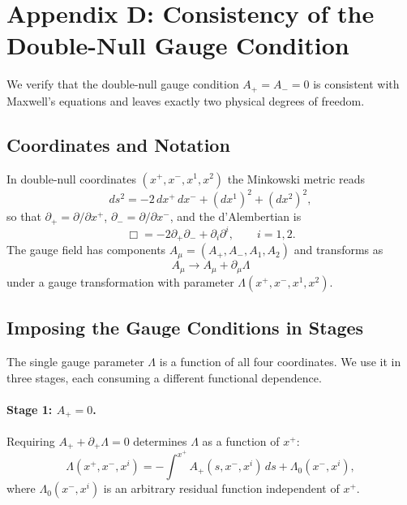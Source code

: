 \section{Appendix D: Consistency of the Double-Null Gauge Condition}
\label{gauge_consistency}

We verify that the double-null gauge condition $A_+ = A_- = 0$ is consistent with 
Maxwell's equations and leaves exactly two physical degrees of freedom.

\subsection{Coordinates and Notation}

In double-null coordinates $(x^+, x^-, x^1, x^2)$ the Minkowski metric reads
\begin{equation}
    ds^2 = -2\,dx^+\,dx^- + (dx^1)^2 + (dx^2)^2,
\end{equation}
so that $\partial_+ = \partial/\partial x^+$, $\partial_- = \partial/\partial x^-$, and 
the d'Alembertian is
\begin{equation}
    \Box = -2\partial_+\partial_- + \partial_i\partial^i, \qquad i = 1,2.
\end{equation}
The gauge field has components $A_\mu = (A_+, A_-, A_1, A_2)$ and transforms as
\begin{equation}
    A_\mu \to A_\mu + \partial_\mu\Lambda
\end{equation}
under a gauge transformation with parameter $\Lambda(x^+, x^-, x^1, x^2)$.

\subsection{Imposing the Gauge Conditions in Stages}

The single gauge parameter $\Lambda$ is a function of all four coordinates. We use 
it in three stages, each consuming a different functional dependence.

\paragraph{Stage 1: $A_+ = 0$.}
Requiring $A_+ + \partial_+\Lambda = 0$ determines $\Lambda$ as a function of $x^+$:
\begin{equation}
    \Lambda(x^+, x^-, x^i) = -\int^{x^+} A_+(s, x^-, x^i)\,ds 
                              + \Lambda_0(x^-, x^i),
\end{equation}
where $\Lambda_0(x^-, x^i)$ is an arbitrary residual function independent of $x^+$.

